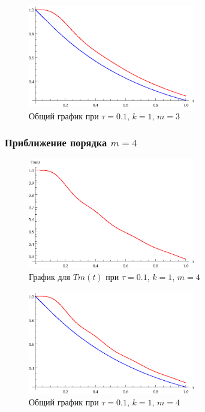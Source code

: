 \begin{figure}[h]
\begin{center}
\includegraphics[width=0.65\textwidth]{./3_results/1_7.eps}
\end{center}
\caption{Общий график при $\tau=0.1$, $k=1$, $m=3$}
\end{figure}

\newpage

\subsubsection{Приближение порядка $m=4$}

\begin{figure}[h]
\begin{center}
\includegraphics[width=0.65\textwidth]{./3_results/1_8.eps}
\end{center}
\caption{График для $Tm(t)$ при $\tau=0.1$, $k=1$, $m=4$}
\end{figure}

\begin{figure}[h]
\begin{center}
\includegraphics[width=0.65\textwidth]{./3_results/1_9.eps}
\end{center}
\caption{Общий график при $\tau=0.1$, $k=1$, $m=4$}
\end{figure}

